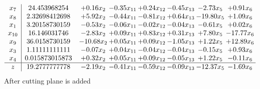 \documentclass[8pt]{article}
\begin{document}
\[\begin{array}{c| c c@{\hskip 2pt} c@{\hskip 2pt} c@{\hskip 2pt} c@{\hskip 2pt} c@{\hskip 2pt} c@{\hskip 2pt} }
 x_{7}   &  24.453968254 & +  0.16 x_{2} & -0.35 x_{11} & +  0.24 x_{12} & -0.45 x_{13} & -2.73 x_{5} & +  0.91 x_{6}\\
 x_{8}   &  2.32698412698 & +  5.92 x_{2} & -0.44 x_{11} & -0.81 x_{12} & +  0.64 x_{13} & -19.80 x_{5} & +  1.09 x_{6}\\
 x_{1}   &  3.20158730159 & -0.53 x_{2} & -0.06 x_{11} & -0.02 x_{12} & -0.04 x_{13} & -0.61 x_{5} & +  0.02 x_{6}\\
 x_{10}   &  16.146031746 & -2.83 x_{2} & +  0.09 x_{11} & +  0.83 x_{12} & +  0.31 x_{13} & +  7.80 x_{5} & -17.77 x_{6}\\
 x_{9}   &  36.0158730159 & -10.68 x_{2} & +  0.05 x_{11} & +  0.09 x_{12} & -1.05 x_{13} & +  1.22 x_{5} & + 12.89 x_{6}\\
 x_{3}   &  1.11111111111 & -0.07 x_{2} & +  0.04 x_{11} & -0.04 x_{12} & -0.04 x_{13} & -0.15 x_{5} & +  0.93 x_{6}\\
 x_{4}   &  0.015873015873 & +  0.32 x_{2} & +  0.05 x_{11} & +  0.09 x_{12} & -0.05 x_{13} & +  1.22 x_{5} & -0.11 x_{6}\\
\hline
z    &  19.2777777778 & -2.19 x_{2} & -0.41 x_{11} & -0.59 x_{12} & -0.09 x_{13} & -12.37 x_{5} & -1.69 x_{6}\\
\end{array}\]
 After cutting plane is added 
\end{document}
